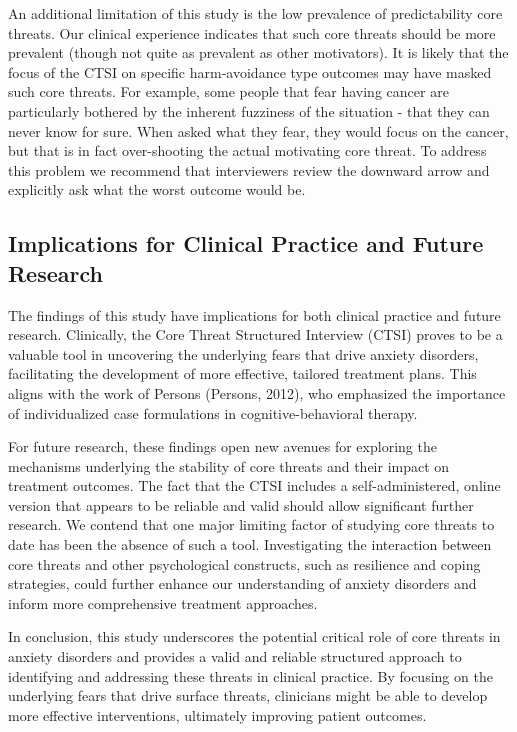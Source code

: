 \documentclass[
  man,floatsintext]{apa7}
\begin{document}
An additional limitation of this study is the low prevalence of predictability core threats.
Our clinical experience indicates that such core threats should be more prevalent (though not quite as prevalent as other motivators).
It is likely that the focus of the CTSI on specific harm-avoidance type outcomes may have masked such core threats.
For example, some people that fear having cancer are particularly bothered by the inherent fuzziness of the situation - that they can never know for sure.
When asked what they fear, they would focus on the cancer, but that is in fact over-shooting the actual motivating core threat.
To address this problem we recommend that interviewers review the downward arrow and explicitly ask what the worst outcome would be.

\subsection{Implications for Clinical Practice and Future Research}\label{implications-for-clinical-practice-and-future-research}

The findings of this study have implications for both clinical practice and future research.
Clinically, the Core Threat Structured Interview (CTSI) proves to be a valuable tool in uncovering the underlying fears that drive anxiety disorders, facilitating the development of more effective, tailored treatment plans.
This aligns with the work of Persons (Persons, 2012), who emphasized the importance of individualized case formulations in cognitive-behavioral therapy.

For future research, these findings open new avenues for exploring the mechanisms underlying the stability of core threats and their impact on treatment outcomes.
The fact that the CTSI includes a self-administered, online version that appears to be reliable and valid should allow significant further research.
We contend that one major limiting factor of studying core threats to date has been the absence of such a tool.
Investigating the interaction between core threats and other psychological constructs, such as resilience and coping strategies, could further enhance our understanding of anxiety disorders and inform more comprehensive treatment approaches.

In conclusion, this study underscores the potential critical role of core threats in anxiety disorders and provides a valid and reliable structured approach to identifying and addressing these threats in clinical practice.
By focusing on the underlying fears that drive surface threats, clinicians might be able to develop more effective interventions, ultimately improving patient outcomes.
\end{document}
